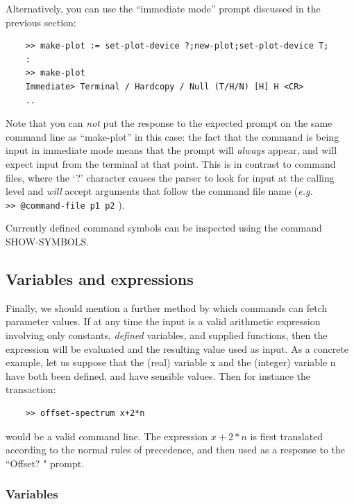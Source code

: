 \documentclass[11pt,twoside]{report}
\newcommand{\eg}{{\it e.g.\,}}
\begin{document}
Alternatively, you can use the ``immediate mode'' prompt discussed in the
previous section:
\begin{verbatim}
    >> make-plot := set-plot-device ?;new-plot;set-plot-device T;
    :
    >> make-plot
    Immediate> Terminal / Hardcopy / Null (T/H/N) [H] H <CR>
    ..
\end{verbatim}
Note that you can {\em not} put the response to the expected prompt on the
same command line as ``make-plot'' in this case: the fact that the command
is being input in immediate mode means that the prompt will {\em always}
appear, and will expect input from the terminal at that point. This is in
contrast to command files, where the `?' character causes the parser to
look for input at the calling level and {\em will} accept arguments that
follow the command file name (\eg \\ \verb+>> @command-file p1 p2+ ).

Currently defined command symbols can be inspected using the command
SHOW-SYMBOLS.


\subsection{Variables and expressions}

Finally, we should mention a further method by which commands can fetch
parameter values. If at any time the input is a valid arithmetic
expression involving only constants, {\em
defined} variables, and supplied functions, then the expression will be
evaluated and the resulting value used as input. As a concrete example, let us
suppose that the (real) variable x and the (integer) variable n have both been
defined, and have sensible values. Then for instance the transaction: 
\begin{verbatim}
    >> offset-spectrum x+2*n
\end{verbatim}
would be a valid command line. The expression $x+2*n$ is first translated
according to the normal rules of precedence, and
then used as a response to the ``Offset? " prompt. 

\subsubsection{Variables}
\end{document}
